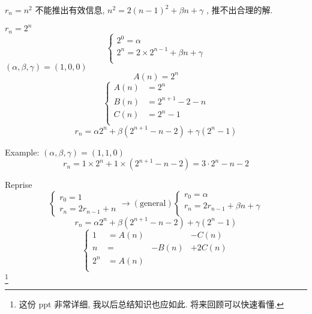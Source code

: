 $ r_n = n^2 $ 不能推出有效信息, $ n^2 = 2(n-1)^2+\beta n + \gamma $ , 推不出合理的解.

$ r_n = 2^n $ 
\begin{equation*}
    \left\{
        \begin{array}{l}
            2^0=\alpha\\
            2^n=2\times 2^{n-1} + \beta n + \gamma\\
        \end{array}
    \right.
\end{equation*}
$ (\alpha, \beta, \gamma) = (1,0,0) $ 
\begin{equation*}
    A(n)=2^n
\end{equation*}
\begin{equation*}
    \left\{
        \begin{array}{ll}
            A(n) &= 2^n \\
            B(n) &= 2^{n+1}-2-n \\
            C(n) &= 2^n-1 \\
        \end{array}
    \right.
\end{equation*}
\begin{equation*}
    r_n = \alpha 2^n + \beta(2^{n+1}-n-2)+\gamma(2^n-1)
\end{equation*}

Example: 
$ (\alpha,\beta,\gamma)=(1,1,0) $ 
\begin{equation*}
    r_n = 1\times 2^n + 1\times (2^{n+1}-n-2) = 3\cdot 2^n-n-2
\end{equation*}

Reprise
\begin{equation*}
    \left\{
        \begin{array}{l}
            r_0 = 1\\
            r_n=2r_{n-1}+n
        \end{array}
    \right. \rightarrow(\text{general})
    \left\{
        \begin{array}{l}
            r_0 = \alpha\\
            r_n = 2r_{n-1}+\beta n+ \gamma\\
        \end{array}
    \right.
\end{equation*}
\begin{equation*}
    r_n = \alpha 2^n + \beta(2^{n+1}-n-2)+\gamma(2^n-1)
\end{equation*}
\begin{equation*}
    \left\{
        \begin{array}{llll}
            1   &= A(n)     &       &-C(n)  \\
            n   &=          &-B(n)  &+2C(n) \\
            2^n &= A(n)     &       &       \\
        \end{array}
    \right.
\end{equation*}
\footnote{这份 ppt 非常详细, 
我以后总结知识也应如此.
将来回顾可以快速看懂.}
